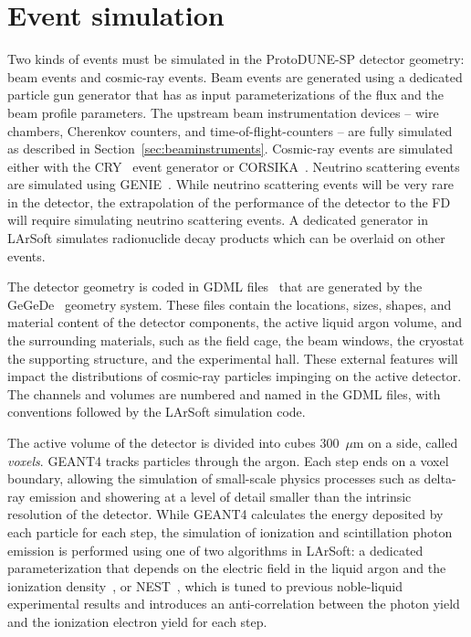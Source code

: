 \section{Event simulation}
\label{sec:larsoftsim}

Two kinds of events must be simulated in the ProtoDUNE-SP detector
geometry: beam events and cosmic-ray events.  Beam events are
generated using a dedicated particle gun generator that has as input
parameterizations of the flux and the beam profile parameters.
The upstream beam instrumentation devices -- wire chambers, Cherenkov
counters, and time-of-flight-counters -- are fully simulated as described in
Section~\ref{sec:beaminstruments}. Cosmic-ray
events are simulated either with the CRY~\cite{cry, cry2} event generator or
CORSIKA~\cite{Heck:1998vt}.  Neutrino scattering events are simulated
using GENIE~\cite{Andreopoulos:2009rq}.  While neutrino scattering events will be very
rare in the detector, the extrapolation of the performance of
the detector to the FD will require simulating neutrino scattering
events.  A dedicated generator in LArSoft simulates
radionuclide decay products which can be overlaid on other events.

The detector geometry is coded in GDML files~\cite{Agostinelli:2002hh} that are
generated by the GeGeDe~\cite{gegede} 
geometry system.  These files
contain the locations, sizes, shapes, and material content of the
detector components, the active liquid argon volume, and the
surrounding materials, such as the field cage, the beam windows, the
cryostat the supporting structure, and the experimental hall.  These
external features will impact the distributions of cosmic-ray
particles impinging on the active detector.  The channels and volumes
are numbered and named in the GDML files, with conventions followed by
the LArSoft simulation code.

The active volume of the detector is divided into cubes 300~$\mu$m on
a side, called \textit{voxels}.  GEANT4 tracks particles through the argon.
Each step ends on a voxel boundary, allowing the simulation of small-scale
physics processes such as delta-ray emission and showering at a level
of detail smaller than the intrinsic resolution of the detector.   While GEANT4
calculates the energy deposited by each particle for each step, the
simulation of ionization and scintillation photon emission 
is performed using one of two algorithms in LArSoft:  a dedicated parameterization that
depends on the electric field in the liquid argon and the ionization
density~\cite{Birks:1964zz}, or  NEST~\cite{Szydagis:2011tk}, which is tuned to
previous noble-liquid experimental results and introduces an
anti-correlation between the photon yield and the ionization electron
yield for each step.  

